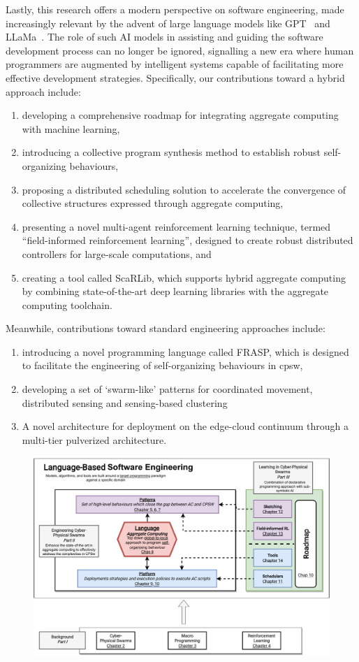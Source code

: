 \begin{refsection}
% 
Lastly, this research offers a modern perspective on software engineering, 
 made increasingly relevant by the advent of large language models like GPT~\cite{floridi2020gpt} and LLaMa~\cite{touvron2023llama}. 
 The role of such AI models in assisting and guiding the software development process can no longer be ignored, 
 signalling a new era where human programmers are augmented by intelligent systems capable of facilitating more effective development strategies.
Specifically, our contributions toward a hybrid approach include:
\begin{enumerate}
    \item developing a comprehensive roadmap for integrating aggregate computing with machine learning,
    \item introducing a collective program synthesis method to establish robust self-organizing behaviours,
    \item proposing a distributed scheduling solution to accelerate the convergence of collective structures expressed through aggregate computing,
    \item presenting a novel multi-agent reinforcement learning technique, termed ``field-informed reinforcement learning'', designed to create robust distributed controllers for large-scale computations, and
    \item creating a tool called ScaRLib, which supports hybrid aggregate computing by combining state-of-the-art deep learning libraries with the aggregate computing toolchain.
\end{enumerate}
Meanwhile, contributions toward standard engineering approaches include:
\begin{enumerate}
    \item introducing a novel programming language called FRASP, 
    which is designed to facilitate the engineering of self-organizing behaviours in \ac{cpsw},
    \item developing a set of `swarm-like' patterns for coordinated movement, distributed sensing and sensing-based clustering
    \item A novel architecture for deployment on the edge-cloud continuum through a multi-tier pulverized architecture.
\end{enumerate}
\begin{figure}
    \includegraphics[width=\textwidth]{chapters/img/contribution-visual-2.drawio.pdf}

\end{figure}
\end{refsection}
